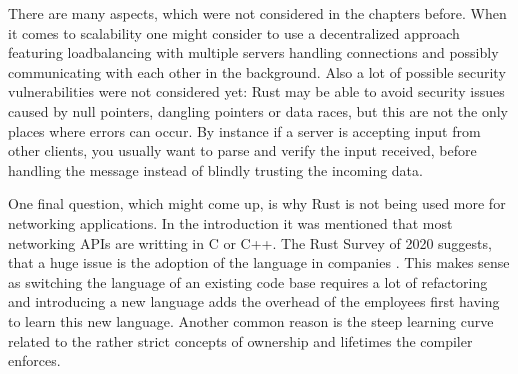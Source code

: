 There are many aspects, which were not considered in the chapters before. When it comes to scalability one might
consider to use a decentralized approach featuring loadbalancing with multiple servers handling connections and
possibly communicating with each other in the background. Also a lot of possible security vulnerabilities were not
considered yet: Rust may be able to avoid security issues caused by null pointers, dangling pointers or data races, but
this are not the only places where errors can occur. By instance if a server is accepting input from other clients, you
usually want to parse and verify the input received, before handling the message instead of blindly trusting the
incoming data.

One final question, which might come up, is why Rust is not being used more for networking applications. In the
introduction it was mentioned that most networking APIs are writting in C or C++. The Rust Survey of 2020 suggests,
that a huge issue is the adoption of the language in companies \cite{rust-survey}. This makes sense as switching the
language of an existing code base requires a lot of refactoring and introducing a new language adds the overhead of the
employees first having to learn this new language. Another common reason is the steep learning curve related to the
rather strict concepts of ownership and lifetimes the compiler enforces.
